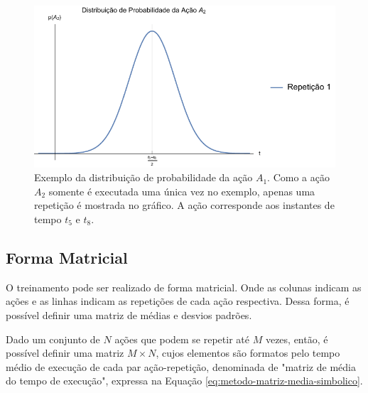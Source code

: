\begin{figure}[htb]
	\caption{\label{fig:metodo-exemplo-bo-media-a2} Exemplo da distribuição de probabilidade da ação $A_1$. Como a ação $A_2$ somente é executada uma única vez no exemplo, apenas uma repetição é mostrada no gráfico. A ação corresponde aos instantes de tempo $t_5$ e $t_8$.}
	\begin{center}
	    \includegraphics[width=\linewidth]{../Mathematica/Images/Exemplo_BO_Media_A2.pdf}
	\end{center}
\end{figure}

\subsection{Forma Matricial}
O treinamento pode ser realizado de forma matricial. Onde as colunas indicam as ações e as linhas indicam as repetições de cada ação respectiva. Dessa forma, é possível definir uma matriz de médias e desvios padrões.

Dado um conjunto de $N$ ações que podem se repetir até $M$ vezes, então, é possível definir uma matriz $M \times N$, cujos elementos são formatos pelo tempo médio de execução de cada par ação-repetição, denominada de "matriz de média do tempo de execução", expressa na Equação \ref{eq:metodo-matriz-media-simbolico}.

\newcommand{\RogielBOMatrix}[1]{
	\ensuremath{
		\left(\begin{array}{cccc}
 			{#1}_{A_1,1} & {#1}_{A_2,1} & \cdots & {#1}_{A_N,1} \\
 			{#1}_{A_1,2} & {#1}_{A_2,2} & \cdots & {#1}_{A_N,2} \\
 			\vdots 		 & \vdots 	    & \ddots & \vdots 		\\
 			{#1}_{A_1,M} & {#1}_{A_2,M} & \cdots & {#1}_{A_N,M}
		\end{array}\right)
	}
}

